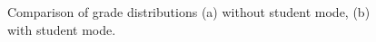 \documentclass[sigconf, review, anonymous, capitalise]{acmart}
\begin{document}
\begin{figure}
    \centering
     \qquad
    \caption{Comparison of grade distributions (a) without student mode, (b) with student mode.}
    \label{fig-distribution-comparison}
\end{figure}
\end{document}
